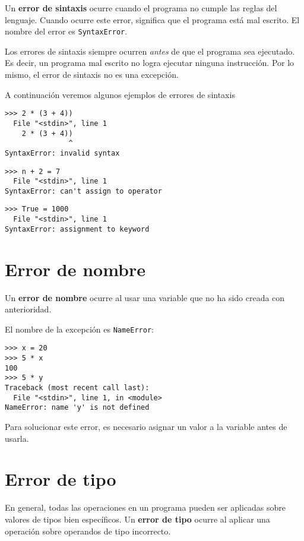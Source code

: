 Un \textbf{error de sintaxis} ocurre cuando el programa no cumple las
reglas del lenguaje. Cuando ocurre este error, significa que el programa
está mal escrito. El nombre del error es \lstinline!SyntaxError!.

Los errores de sintaxis siempre ocurren \emph{antes} de que el programa
sea ejecutado. Es decir, un programa mal escrito no logra ejecutar
ninguna instrucción. Por lo mismo, el error de sintaxis no es una
excepción.

A continuación veremos algunos ejemplos de errores de sintaxis

\begin{lstlisting}
>>> 2 * (3 + 4))
  File "<stdin>", line 1
    2 * (3 + 4))
               ^
SyntaxError: invalid syntax
\end{lstlisting}

\begin{lstlisting}
>>> n + 2 = 7
  File "<stdin>", line 1
SyntaxError: can't assign to operator
\end{lstlisting}

\begin{lstlisting}
>>> True = 1000
  File "<stdin>", line 1
SyntaxError: assignment to keyword
\end{lstlisting}

\section{Error de nombre}

Un \textbf{error de nombre} ocurre al usar una variable que no ha sido
creada con anterioridad.

El nombre de la excepción es \lstinline!NameError!:

\begin{lstlisting}
>>> x = 20
>>> 5 * x
100
>>> 5 * y
Traceback (most recent call last):
  File "<stdin>", line 1, in <module>
NameError: name 'y' is not defined
\end{lstlisting}

Para solucionar este error, es necesario asignar un valor a la variable
antes de usarla.

\section{Error de tipo}

En general, todas las operaciones en un programa pueden ser aplicadas
sobre valores de tipos bien específicos. Un \textbf{error de tipo}
ocurre al aplicar una operación sobre operandos de tipo incorrecto.

